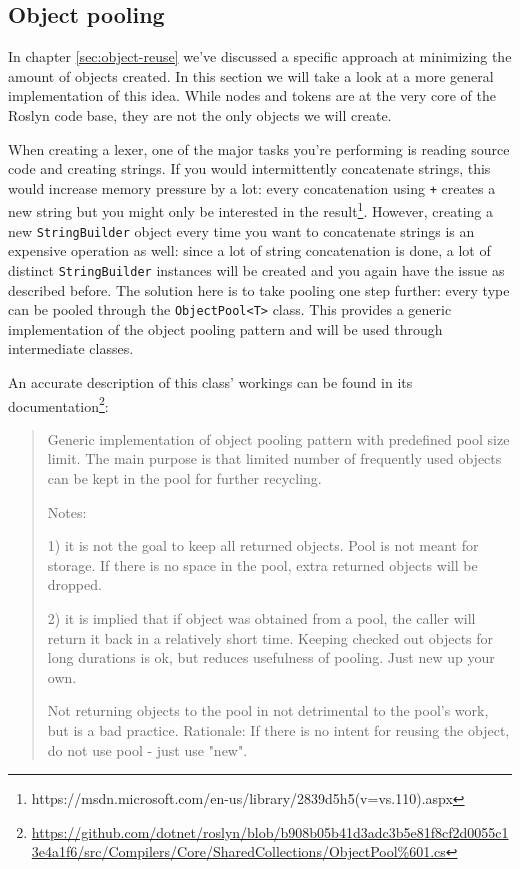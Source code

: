\subsection{Object pooling}
\label{sec:object-pooling}

In chapter \ref{sec:object-reuse} we've discussed a specific approach at minimizing the amount of objects created. In this section we will take a look at a more general implementation of this idea. While nodes and tokens are at the very core of the Roslyn code base, they are not the only objects we will create. 

When creating a lexer, one of the major tasks you're performing is reading source code and creating strings. If you would intermittently concatenate strings, this would increase memory pressure by a lot: every concatenation using \texttt{+} creates a new string but you might only be interested in the result\footnote{https://msdn.microsoft.com/en-us/library/2839d5h5(v=vs.110).aspx}. 
However, creating a new \texttt{StringBuilder} object every time you want to concatenate strings is an expensive operation as well: since a lot of string concatenation is done, a lot of distinct \texttt{StringBuilder} instances will be created and you again have the issue as described before. The solution here is to take pooling one step further: every type can be pooled through the \texttt{ObjectPool<T>} class.\parencite{Warren2014} This provides a generic implementation of the object pooling pattern and will be used through intermediate classes.

An accurate description of this class' workings can be found in its documentation\footnote{\url{https://github.com/dotnet/roslyn/blob/b908b05b41d3adc3b5e81f8cf2d0055c13e4a1f6/src/Compilers/Core/SharedCollections/ObjectPool\%601.cs}}:

\begin{quotation}
Generic implementation of object pooling pattern with predefined pool size limit. The main
purpose is that limited number of frequently used objects can be kept in the pool for
further recycling.

Notes: 

1) it is not the goal to keep all returned objects. Pool is not meant for storage. If there
   is no space in the pool, extra returned objects will be dropped.

2) it is implied that if object was obtained from a pool, the caller will return it back in
   a relatively short time. Keeping checked out objects for long durations is ok, but 
   reduces usefulness of pooling. Just new up your own.

Not returning objects to the pool in not detrimental to the pool's work, but is a bad practice. 
Rationale: 
   If there is no intent for reusing the object, do not use pool - just use "new". 
\end{quotation}

